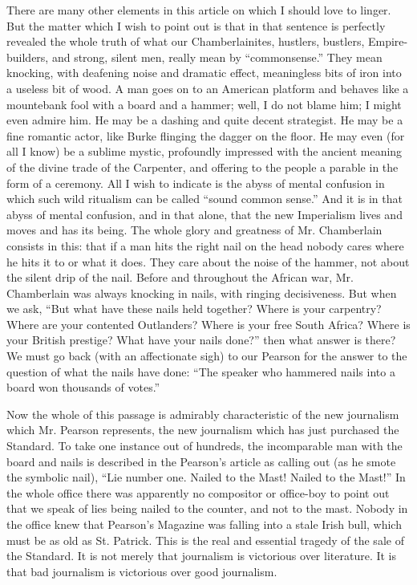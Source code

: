 There are many other elements in this article on which I should love to linger. But the matter which I wish to point out is that in that sentence is perfectly revealed the whole truth of what our Chamberlainites, hustlers, bustlers, Empire-builders, and strong, silent men, really mean by “commonsense.” They mean knocking, with deafening noise and dramatic effect, meaningless bits of iron into a useless bit of wood. A man goes on to an American platform and behaves like a mountebank fool with a board and a hammer; well, I do not blame him; I might even admire him. He may be a dashing and quite decent strategist. He may be a fine romantic actor, like Burke flinging the dagger on the floor. He may even (for all I know) be a sublime mystic, profoundly impressed with the ancient meaning of the divine trade of the Carpenter, and offering to the people a parable in the form of a ceremony. All I wish to indicate is the abyss of mental confusion in which such wild ritualism can be called “sound common sense.” And it is in that abyss of mental confusion, and in that alone, that the new Imperialism lives and moves and has its being. The whole glory and greatness of Mr. Chamberlain consists in this: that if a man hits the right nail on the head nobody cares where he hits it to or what it does. They care about the noise of the hammer, not about the silent drip of the nail. Before and throughout the African war, Mr. Chamberlain was always knocking in nails, with ringing decisiveness. But when we ask, “But what have these nails held together? Where is your carpentry? Where are your contented Outlanders? Where is your free South Africa? Where is your British prestige? What have your nails done?” then what answer is there? We must go back (with an affectionate sigh) to our Pearson for the answer to the question of what the nails have done: “The speaker who hammered nails into a board won thousands of votes.”

Now the whole of this passage is admirably characteristic of the new journalism which Mr. Pearson represents, the new journalism which has just purchased the Standard. To take one instance out of hundreds, the incomparable man with the board and nails is described in the Pearson’s article as calling out (as he smote the symbolic nail), “Lie number one. Nailed to the Mast! Nailed to the Mast!” In the whole office there was apparently no compositor or office-boy to point out that we speak of lies being nailed to the counter, and not to the mast. Nobody in the office knew that Pearson’s Magazine was falling into a stale Irish bull, which must be as old as St. Patrick. This is the real and essential tragedy of the sale of the Standard. It is not merely that journalism is victorious over literature. It is that bad journalism is victorious over good journalism.

